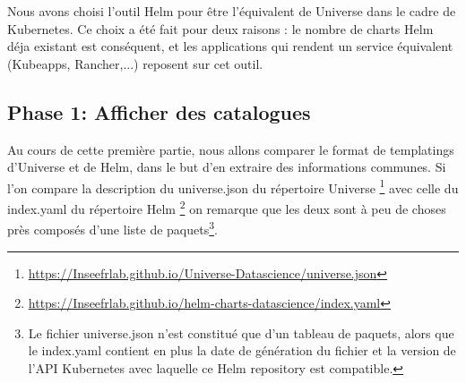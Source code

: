 \documentclass[11pt,fleqn]{book} %
\begin{document}
Nous avons choisi l'outil Helm pour être l'équivalent de Universe dans le cadre de Kubernetes. Ce choix a été fait pour deux raisons : le nombre de charts Helm déja existant est conséquent, et les applications qui rendent un service équivalent (Kubeapps, Rancher,...) reposent sur cet outil. 
\subsection{Phase 1: Afficher des catalogues}
Au cours de cette première partie, nous allons comparer le format de templatings d'Universe et de Helm, dans le but d'en extraire des informations communes. Si l'on compare la description du universe.json du répertoire Universe \footnote{\url{https://Inseefrlab.github.io/Universe-Datascience/universe.json}} avec celle du index.yaml du répertoire Helm \footnote{\url{https://Inseefrlab.github.io/helm-charts-datascience/index.yaml}} on remarque que les deux sont à peu de choses près composés d'une liste de paquets\footnote{Le fichier universe.json n'est constitué que d'un tableau de paquets, alors que le index.yaml contient en plus la date de génération du fichier et la version de l'API Kubernetes avec laquelle ce Helm repository est compatible.}. \\ 
\end{document}
